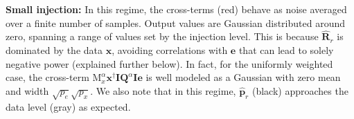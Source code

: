 \documentclass[preprint2,numberedappendix,tighten]{aastex6}  %
\begin{document}
{\bf Small injection:}
In this regime, the cross-terms (red) behave as noise averaged over a finite number of samples. Output values are Gaussian distributed around zero, spanning a range of values set by the injection level. This is because $\widehat{\textbf{R}}_{r}$ is dominated by the data $\textbf{x}$, avoiding correlations with $\textbf{e}$ that can lead to solely negative power (explained further below). In fact, for the uniformly weighted case, the cross-term  $\text{M}^{\alpha}_{x}\textbf{x}^{\dagger}\textbf{I}\textbf{Q}^{\alpha}\textbf{I}\textbf{e}$ is well modeled as a Gaussian with zero mean and width $\sqrt{p_e}\sqrt{p_x}$. We also note that in this regime, $\widehat{\textbf{p}}_{r}$ (black) approaches the data level (gray) as expected. %
\end{document}
